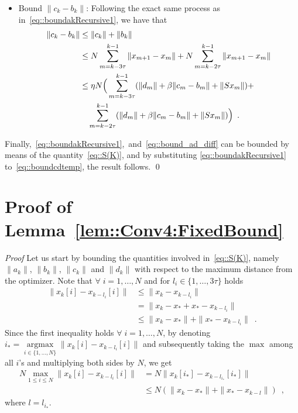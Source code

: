 \documentclass[envcountsect]{svjour3}
\newcommand{\argmax}{\operatorname{ argmax}}
\begin{document}
\begin{itemize}
 \item Bound $\|c_k-b_k\|$: Following the exact same process as in~\eqref{eq::boundakRecursive1}, we have that
  \begin{align}{\label{eq::bound_ad_diff}}
  \|c_k-b_k\| \nonumber&\leq \|c_k\| + \|b_k\| \\
              \nonumber&\leq N\sum_{m=k-3\tau}^{k-1}\|x_{m+1}-x_m\| + N\sum_{m=k-2\tau}^{k-1}\|x_{m+1}-x_m\|\\\nonumber
                                     &\leq \eta N\Big(\sum_{m=k-3\tau}^{k-1}(\|d_m\| + \beta\|c_m-b_m\| + \|Sx_m\|) +\\
                                     &\quad\sum_{m=k-2\tau}^{k-1}(\|d_m\| + \beta\|c_m-b_m\| + \|Sx_m\|)\Big)\enspace.
 \end{align}
\end{itemize}
Finally,~\eqref{eq::boundakRecursive1},~and~\eqref{eq::bound_ad_diff} can be bounded by means of the quantity~\eqref{eq::S(K)}, and by substituting \eqref{eq::boundakRecursive1} to~\eqref{eq::boundcdtemp}, the result follows. \qed


\section{Proof of Lemma~\ref{lem::Conv4:FixedBound} }{\label{app::Conv4:FixedBound}}
{\it Proof}
Let us start by bounding the quantities involved in~\eqref{eq::S(K)}, namely $\|a_k\|$, $\|b_k\|$, $\|c_k\|$ and $\|d_k\|$
with respect to the maximum distance from the optimizer. Note that $\forall\;i=1,\ldots,N$ and for $l_i\in\{1,\ldots,3\tau\}$ holds
\begin{align*}
\|x_k[i]-x_{k-l_i}[i]\|  & \leq \|x_k-x_{k-l_i}\| \\
                         & = \|x_k-x_\ast+x_\ast-x_{k-l_i}\| \\
                         & \leq \|x_k-x_\ast\| + \|x_\ast-x_{k-l_i}\|\enspace.
\end{align*}
Since the first inequality holds $\forall\;i=1,\ldots,N$, by denoting $i_\ast=\underset{i\in\{1,\ldots,N\}}{\argmax}\|x_k[i]-x_{k-l_i}[i]\|$ and subsequently taking the $\max$ among all $i$'s and multiplying both sides by $N$, we get
\begin{align*}
N\underset{1\leq i\leq N}{\max}\|x_k[i]-x_{k-l_i}[i]\| &= N\|x_k[i_\ast]-x_{k-l_{i_\ast}}[i_\ast]\| \\
                                                       &\leq N\left(\|x_k-x_\ast\| + \|x_\ast-x_{k-l}\|\right) \enspace,
\end{align*}
where $l=l_{i_\ast}$.
\end{document}
